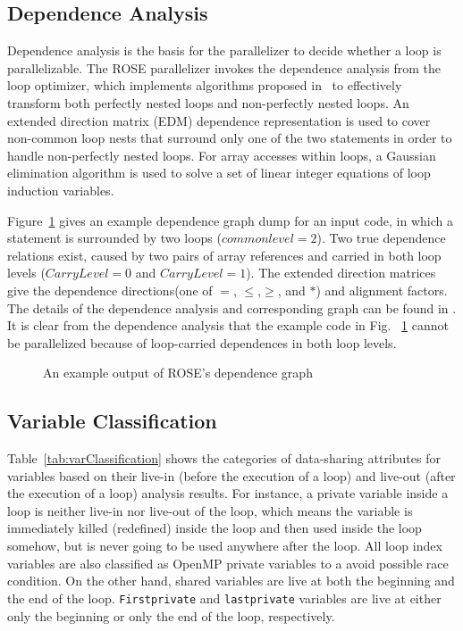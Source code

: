 \subsection{Dependence Analysis}
Dependence analysis is the basis for the parallelizer to decide whether a loop is
parallelizable.
The ROSE parallelizer invokes the dependence analysis from the loop optimizer, which implements algorithms proposed in~%
\cite{YAK:PLDI00,YK:LACSI02} to effectively transform
both perfectly nested loops and non-perfectly nested loops.
An extended direction matrix
(EDM) dependence representation is used to cover non-common loop nests that surround
only one of the two statements in order to handle non-perfectly
nested loops. For array accesses within loops, a Gaussian elimination
algorithm is used to solve a set of linear integer equations of loop induction
variables. 

Figure~\ref{code.depGraph} gives an example dependence graph dump for an input
code, in which a statement is surrounded by two loops
($\mathit{commonlevel} = 2$). 
Two true dependence relations exist, caused by two pairs of array
references and carried in both loop levels ($\mathit{CarryLevel} = 0$ and
$\mathit{CarryLevel} = 1$).  
The extended direction matrices give the
dependence directions(one of $=$, $\leq$,$\geq$, and $*$) and alignment factors.
The details of the dependence analysis and corresponding graph
can be found in \cite{YAK:PLDI00,YK:LACSI02}.
It is clear from the dependence analysis that the example code in Fig.~%
\ref{code.depGraph} cannot be parallelized because of 
loop-carried dependences in both loop levels.

\begin{figure}[!ht]
 \centering
        
  \caption{\label{code.depGraph} An example output of ROSE's dependence graph}
\end{figure}


\subsection{Variable Classification}
Table~\ref{tab:varClassification} shows the categories of
data-sharing attributes for variables based on their live-in (before the
execution of a loop) and live-out (after the execution of a loop)
analysis results. For instance, a private variable inside a
loop is neither live-in nor live-out of the loop, which means the 
variable is immediately killed (redefined) inside the loop and then used inside
the loop somehow, but is never going to be used anywhere after the loop.
All loop index variables are also classified as OpenMP private variables to a avoid
possible race condition.
On the other hand, shared variables are live at both the beginning and the end of the loop.
\lstinline{Firstprivate} and \lstinline{lastprivate} variables are live at either only the beginning or
only the end of the loop, respectively.

